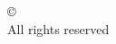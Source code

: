 
\clearpage
\vspace*{\fill}
\begin{center}
\begin{minipage}{.6\textwidth}
\vspace*{0.25in}
\begin{center}
    \copyright~\thesisauthor{} \\
    All rights reserved
\end{center}
\end{minipage}
\end{center}
\vfill %
\clearpage
